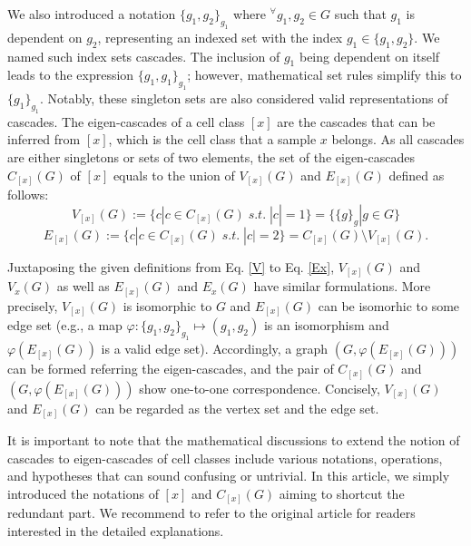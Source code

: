 \documentclass{article}
\begin{document}
We also introduced a notation $\{g_1, g_2\}_{g_1}$ where $^\forall g_1,g_2\in G$ such 
that $g_1$ is dependent on $g_2$, representing an indexed 
set with the index $g_1\in\{g_1, g_2\}$. We named such index sets cascades. The inclusion of $g_1$ 
being dependent on itself leads to the expression $\{g_1, g_1\}_{g_1}$; however, 
mathematical set rules simplify this to $\{g_1\}_{g_1}$. Notably, these singleton 
sets are also considered valid representations of cascades. The eigen-cascades of a cell class $[x]$ are the 
cascades that can be inferred from $[x]$, which is the cell class that a sample $x$ belongs. 
As all cascades are either singletons or sets of two elements, the set of the 
eigen-cascades $C_{[x]}(G)$ of $[x]$ equals to the union of $V_{[x]}(G)$ and 
$E_{[x]}(G)$ defined as follows:
\begin{equation}\label{Vx}
  V_{[x]}(G):=\{c|c\in C_{[x]}(G)\; s.t.\; |c|=1\}=\{\{g\}_g|g\in G\}
\end{equation}
\begin{equation}\label{Ex}
  E_{[x]}(G):=\{c|c\in C_{[x]}(G)\; s.t.\; |c|=2\}=C_{[x]}(G)\setminus V_{[x]}(G).
\end{equation}

Juxtaposing the given definitions from Eq. \eqref{V} to Eq. \eqref{Ex}, $V_{[x]}(G)$ and $V_x(G)$ 
as well as $E_{[x]}(G)$ and $E_x(G)$ have similar formulations. More precisely, $V_{[x]}(G)$ is isomorphic to $G$ and 
$E_{[x]}(G)$ can be isomorhic to some edge set (e.g., a map $\varphi:\{g_1,g_2\}_{g_1}\mapsto(g_1,g_2)$ 
is an isomorphism and $\varphi(E_{[x]}(G))$ is a valid edge set). Accordingly, a graph $(G, \varphi(E_{[x]}(G)))$ can be formed 
referring the eigen-cascades, and the pair of $C_{[x]}(G)$ and $(G, \varphi(E_{[x]}(G)))$ show one-to-one correspondence.
Concisely, $V_{[x]}(G)$ and $E_{[x]}(G)$ can be regarded as the vertex set and the edge set.

It is important to note that the mathematical discussions to extend the notion of cascades to eigen-cascades of 
cell classes include various notations, operations, and hypotheses that can sound confusing or untrivial. 
In this article, we simply introduced the notations of $[x]$ and $C_{[x]}(G)$ aiming to shortcut the redundant part. 
We recommend to refer to the original article for readers interested in the detailed explanations.

\newpage
\end{document}
